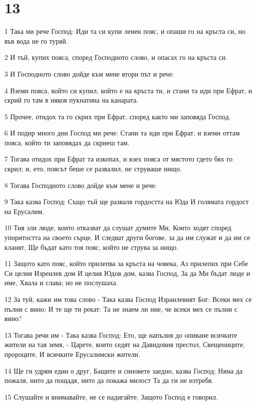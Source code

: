 \chapter{13}

\par 1 Така ми рече Господ: Иди та си купи ленен пояс, и опаши го на кръста си, но във вода не го туряй.
\par 2 И тъй, купих пояса, според Господното слово, и опасах го на кръста си.
\par 3 И Господното слово дойде към мене втори път и рече:
\par 4 Вземи пояса, който си купил, който е на кръста ти, и стани та иди при Ефрат, и скрий го там в някоя пукнатина на канарата.
\par 5 Прочее, отидох та го скрих при Ефрат, според както ми заповяда Господ.
\par 6 И подир много дни Господ ми рече: Стани та иди при Ефрат, и вземи оттам пояса, който ти заповядах да скриеш там.
\par 7 Тогава отидох при Ефрат та изкопах, и взех пояса от мястото гдето бях го скрил; и, ето, поясът беше се развалил, не струваше нищо.
\par 8 Тогава Господното слово дойде към мене и рече:
\par 9 Така казва Господ: Също тъй ще разваля гордостта на Юда И голямата гордост на Ерусалим.
\par 10 Тия зли люде, които отказват да слушат думите Ми, Които ходят според упоритостта на своето сърце, И следват други богове, за да им служат и да им се кланят, Ще бъдат като тоя пояс, който не струва за нищо.
\par 11 Защото като пояс, който прилепва за кръста на човека, Аз прилепих при Себе Си целия Изреилев дом И целия Юдов дом, казва Господ, За да Ми бъдат люде и име, Хвала и слава; но не послушаха.
\par 12 За туй, кажи им това слово - Така казва Господ Израилевият Бог: Всеки мех се пълни с вино; И те ще ти рекат: Та не знаем ли ние, че всеки мех се пълни с вино?
\par 13 Тогава речи им - Така казва Господ: Ето, ще напълня до опиване всичките жители на тая земя, - Царете, които седят на Давидовия престол, Свещениците, пророците, И всичките Ерусалимски жители.
\par 14 Ще ги удрям един о друг, Бащите и синовете заедно, казва Господ; Няма да пожаля, нито да пощадя, нито да покажа милост Та да ги не изтребя.
\par 15 Слушайте и внимавайте, не се надигайте; Защото Господ е говорил.

